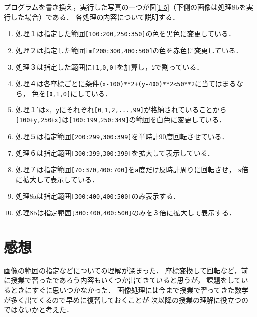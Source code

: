 \documentclass[autodetect-engine,dvi=dvipdfmx,ja=standard,
               a4j,11pt]{bxjsarticle}
\begin{document}
プログラムを書き換え，実行した写真の一つが図\ref{1-5}（下側の画像は処理8bを実行した場合）である．
各処理の内容について説明する．
\begin{enumerate}
  \item 処理１は指定した範囲\verb|[100:200,250:350]|の色を黒色に変更している．
  \item 処理２は指定した範囲\verb|im[200:300,400:500]|の色を赤色に変更している．
  \item 処理３は指定した範囲に\verb|[1,0,0]|を加算し，$2$で割っている．
  \item 処理４は各座標ごとに条件\verb|(x-100)**2+(y-400)**2<50**2|に当てはまるなら，
色を\verb|[0,1,0]|にしている．
  \item 処理１’は\verb|x|，\verb|y|にそれぞれ\verb|[0,1,2,...,99]|が格納されていることから
  \verb|[100+y,250+x]|は\verb|[100:199,250:349]|の範囲を白色に変更している．
 \item  処理５は指定範囲\verb|[200:299,300:399]|を半時計90度回転させている．
  \item 処理６は指定範囲\verb|[300:399,300:399]|を拡大して表示している．
  \item 処理７は指定範囲\verb|[70:370,400:700]|を\verb|a|度だけ反時計周りに回転させ，
  \verb|s|倍に拡大して表示している．
  \item 処理8aは指定範囲\verb|[300:400,400:500]|のみ表示する．
  \item 処理8bは指定範囲\verb|[300:400,400:500]|のみを３倍に拡大して表示する．
\end{enumerate}






\section{感想}
画像の範囲の指定などについての理解が深まった．
座標変換して回転など，前に授業で習ったであろう内容もいくつか出てきていると思うが，
課題をしているときにすぐに思いつかなかった．
画像処理には今まで授業で習ってきた数学が多く出てくるので早めに復習しておくことが
次以降の授業の理解に役立つのではないかと考えた．
\end{document}
